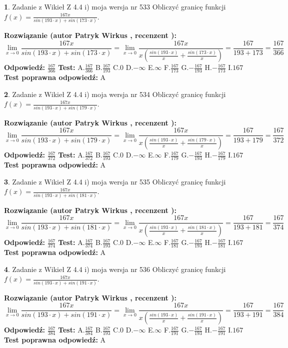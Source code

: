 \documentclass[12pt, a4paper]{article}
\theoremstyle{definition} %
\newtheorem{zad}{}
\newcommand{\zadStart}[1]{\begin{zad}#1\newline}
\newcommand{\zadStop}{\end{zad}}
\newcommand{\rozwStart}[2]{\noindent \textbf{Rozwiązanie (autor #1 , recenzent #2): }\newline}
\newcommand{\rozwStop}{\newline}
\newcommand{\odpStart}{\noindent \textbf{Odpowiedź:}\newline}
\newcommand{\odpStop}{\newline}
\newcommand{\testStart}{\noindent \textbf{Test:}\newline}
\newcommand{\testStop}{\newline}
\newcommand{\kluczStart}{\noindent \textbf{Test poprawna odpowiedź:}\newline}
\newcommand{\kluczStop}{\newline}
\begin{document}
\zadStart{Zadanie z Wikieł Z 4.4 i) moja wersja nr 533}
Obliczyć granicę funkcji $f(x)=\frac{167x}{sin(193\cdot x) +sin(173\cdot x)}$.
\zadStop
\rozwStart{Patryk Wirkus}{}
$$\lim\limits_{x\to 0}\frac{167x}{sin(193\cdot x) +sin(173\cdot x)}=\lim\limits_{x\to 0}\frac{167x}{x(\frac{sin(193\cdot x)}{x}+\frac{sin(173\cdot x)}{x})}=\frac{167}{193+173} = \frac{167}{366}$$
\rozwStop
\odpStart
$\frac{167}{366}$
\odpStop
\testStart
A.$\frac{167}{366}$
B.$\frac{167}{193}$
C.$0$
D.$-\infty$
E.$\infty$
F.$\frac{167}{173}$
G.$-\frac{167}{193}$
H.$-\frac{167}{173}$
I.$167$
\testStop
\kluczStart
A
\kluczStop



\zadStart{Zadanie z Wikieł Z 4.4 i) moja wersja nr 534}
Obliczyć granicę funkcji $f(x)=\frac{167x}{sin(193\cdot x) +sin(179\cdot x)}$.
\zadStop
\rozwStart{Patryk Wirkus}{}
$$\lim\limits_{x\to 0}\frac{167x}{sin(193\cdot x) +sin(179\cdot x)}=\lim\limits_{x\to 0}\frac{167x}{x(\frac{sin(193\cdot x)}{x}+\frac{sin(179\cdot x)}{x})}=\frac{167}{193+179} = \frac{167}{372}$$
\rozwStop
\odpStart
$\frac{167}{372}$
\odpStop
\testStart
A.$\frac{167}{372}$
B.$\frac{167}{193}$
C.$0$
D.$-\infty$
E.$\infty$
F.$\frac{167}{179}$
G.$-\frac{167}{193}$
H.$-\frac{167}{179}$
I.$167$
\testStop
\kluczStart
A
\kluczStop



\zadStart{Zadanie z Wikieł Z 4.4 i) moja wersja nr 535}
Obliczyć granicę funkcji $f(x)=\frac{167x}{sin(193\cdot x) +sin(181\cdot x)}$.
\zadStop
\rozwStart{Patryk Wirkus}{}
$$\lim\limits_{x\to 0}\frac{167x}{sin(193\cdot x) +sin(181\cdot x)}=\lim\limits_{x\to 0}\frac{167x}{x(\frac{sin(193\cdot x)}{x}+\frac{sin(181\cdot x)}{x})}=\frac{167}{193+181} = \frac{167}{374}$$
\rozwStop
\odpStart
$\frac{167}{374}$
\odpStop
\testStart
A.$\frac{167}{374}$
B.$\frac{167}{193}$
C.$0$
D.$-\infty$
E.$\infty$
F.$\frac{167}{181}$
G.$-\frac{167}{193}$
H.$-\frac{167}{181}$
I.$167$
\testStop
\kluczStart
A
\kluczStop



\zadStart{Zadanie z Wikieł Z 4.4 i) moja wersja nr 536}
Obliczyć granicę funkcji $f(x)=\frac{167x}{sin(193\cdot x) +sin(191\cdot x)}$.
\zadStop
\rozwStart{Patryk Wirkus}{}
$$\lim\limits_{x\to 0}\frac{167x}{sin(193\cdot x) +sin(191\cdot x)}=\lim\limits_{x\to 0}\frac{167x}{x(\frac{sin(193\cdot x)}{x}+\frac{sin(191\cdot x)}{x})}=\frac{167}{193+191} = \frac{167}{384}$$
\rozwStop
\odpStart
$\frac{167}{384}$
\odpStop
\testStart
A.$\frac{167}{384}$
B.$\frac{167}{193}$
C.$0$
D.$-\infty$
E.$\infty$
F.$\frac{167}{191}$
G.$-\frac{167}{193}$
H.$-\frac{167}{191}$
I.$167$
\testStop
\kluczStart
A
\kluczStop
\end{document}
